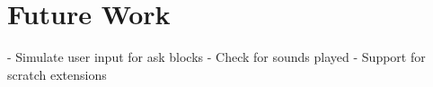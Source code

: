 \section{Future Work}
- Simulate user input for ask blocks
- Check for sounds played
- Support for scratch extensions
